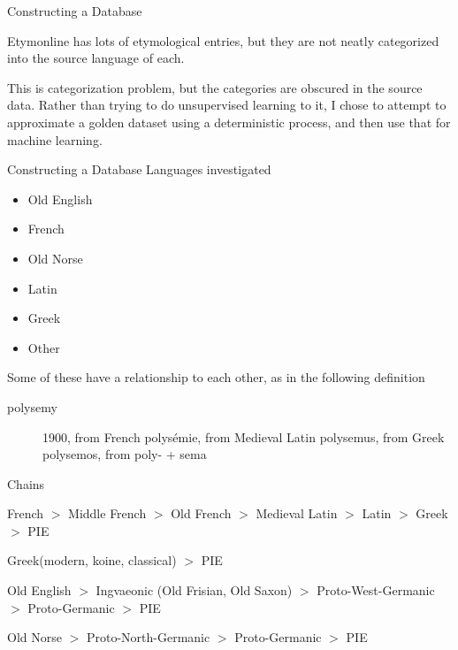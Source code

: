 \documentclass[10pt]{beamer}
\begin{document}
\begin{frame}[fragile]{Constructing a Database}

  Etymonline has lots of etymological entries, but they are not neatly categorized into the source language of each.

  This is categorization problem, but the categories are obscured in the source data. Rather than trying to do unsupervised learning to it, I chose to attempt to approximate a golden dataset using a deterministic process, and then use that for machine learning.

\end{frame}

\begin{frame}[fragile]{Constructing a Database}
  Languages investigated

  \begin{itemize}[<+->]
  \item Old English
  \item French
  \item Old Norse
  \item Latin
  \item Greek
  \item Other
  \end{itemize}

\pause
  Some of these have a relationship to each other, as in the following definition


  \begin{description}
  \item[polysemy] 1900, from French polysémie, from Medieval Latin polysemus, from Greek polysemos, from poly- + sema
  \end{description}

\end{frame}



\begin{frame}[fragile]{Chains}

  French $>$ Middle French $>$ Old French $>$ Medieval Latin $>$ Latin $>$ Greek $>$ PIE

  Greek(modern, koine, classical) $>$ PIE

  Old English $>$ Ingvaeonic (Old Frisian, Old Saxon) $>$ Proto-West-Germanic $>$ Proto-Germanic $>$ PIE


  Old Norse $>$ Proto-North-Germanic $>$ Proto-Germanic $>$ PIE

\end{frame}
\end{document}
